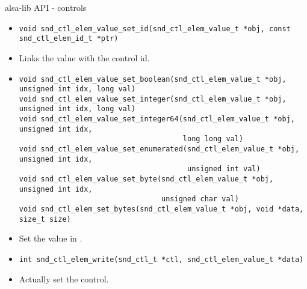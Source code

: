 \begin{frame}[fragile]{alsa-lib API - controls}
  \begin{itemize}
  \item
    \begin{block}{}
    \fontsize{9}{9}\selectfont
      \begin{verbatim}
void snd_ctl_elem_value_set_id(snd_ctl_elem_value_t *obj, const snd_ctl_elem_id_t *ptr)
      \end{verbatim}
    \end{block}
    \item Links the value with the control id.
  \item
    \begin{block}{}
    \fontsize{9}{9}\selectfont
      \begin{verbatim}
void snd_ctl_elem_value_set_boolean(snd_ctl_elem_value_t *obj, unsigned int idx, long val)
void snd_ctl_elem_value_set_integer(snd_ctl_elem_value_t *obj, unsigned int idx, long val)
void snd_ctl_elem_value_set_integer64(snd_ctl_elem_value_t *obj, unsigned int idx,
                                      long long val)
void snd_ctl_elem_value_set_enumerated(snd_ctl_elem_value_t *obj, unsigned int idx,
                                       unsigned int val)
void snd_ctl_elem_value_set_byte(snd_ctl_elem_value_t *obj, unsigned int idx,
                                 unsigned char val)
void snd_ctl_elem_set_bytes(snd_ctl_elem_value_t *obj, void *data, size_t size)
      \end{verbatim}
    \end{block}
  \item Set the value in .
  \item
    \begin{block}{}
    \fontsize{9}{9}\selectfont
      \begin{verbatim}
int snd_ctl_elem_write(snd_ctl_t *ctl, snd_ctl_elem_value_t *data)
      \end{verbatim}
    \end{block}
  \item Actually set the control.
  \end{itemize}
\end{frame}

